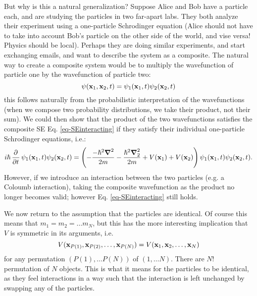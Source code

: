 But why is this a natural generalization? Suppose Alice and Bob have a particle each, and are studying the particles in two far-apart labs. They both analyze their experiment using a one-particle Schrodinger equation (Alice should not have to take into account Bob's particle on the other side of the world, and vise versa! Physics should be local). Perhaps they are doing similar experiments, and start exchanging emails, and want to describe the system as a composite. The natural way to create a composite system would be to multiply the wavefunction of particle one by the wavefunction of particle two:
\begin{equation}
    \psi(\mathbf{x}_1, \mathbf{x}_2, t) = \psi_1(\mathbf{x}_1, t)\psi_2(\mathbf{x}_2, t)
\end{equation}
this follows naturally from the probabilistic interpretation of the wavefunctions (when we compose two probability distributions, we take their product, not their sum). We could then show that the product of the two wavefunctions satisfies the composite SE Eq. \eqref{eq-SEinteracting} if they satisfy their individual one-particle Schrodinger equations, i.e.:
\begin{equation}
    i\hbar\dpd{}{t}\psi_1(\v{x}_1, t)\psi_2(\v{x}_2, t) = \left(-\frac{-\hbar^2\nabla^2}{2m} - \frac{\hbar^2\nabla_2^2}{2m} + V(\v{x}_1) + V(\v{x}_2)\right)\psi_1(\v{x}_1, t)\psi_2(\v{x}_2, t).
\end{equation}
However, if we introduce an interaction between the two particles (e.g. a Coloumb interaction), taking the composite wavefunction as the product no longer becomes valid; however Eq. \eqref{eq-SEinteracting} still holds.

We now return to the assumption that the particles are identical. Of course this means that $m_1 = m_2 = \ldots m_N$, but this has the more interesting implication that $V$ is symmetric in its arguments, i.e.
\begin{equation}
    V(\mathbf{x}_{P(1)}, \mathbf{x}_{P(2)}, \ldots, \mathbf{x}_{P(N)}) =  V(\mathbf{x}_1, \mathbf{x}_2, \ldots, \mathbf{x}_N)
\end{equation}
for any permutation $(P(1), \ldots P(N))$ of $(1, \ldots N)$. There are $N!$ permutation of $N$ objects. This is what it means for the particles to be identical, as they feel interactions in  a way such that the interaction is left unchanged by swapping any of the particles.